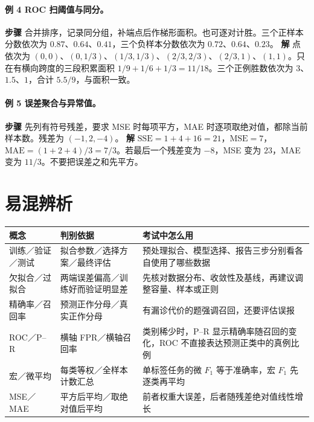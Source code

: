 \documentclass[UTF8,a4paper,zihao=-4,fontset=fandol]{ctexrep}
\begin{document}
\paragraph{例 4 ROC 扫阈值与同分。}
\textbf{步骤} 合并排序，记录同分组，补端点后作梯形面积。也可逐对计胜。三个正样本分数依次为 \(0.87\)、\(0.64\)、\(0.41\)，三个负样本分数依次为 \(0.72\)、\(0.64\)、\(0.23\)。
\textbf{解} 点依次为 \((0,0)\)、\((0,1/3)\)、\((1/3,1/3)\)、\((2/3,2/3)\)、\((2/3,1)\)、\((1,1)\)。只在有横向跨度的三段积累面积 \(1/9+1/6+1/3=11/18\)。三个正例胜数依次为 \(3\)、\(1.5\)、\(1\)，合计 \(5.5/9\)，与面积一致。

\paragraph{例 5 误差聚合与异常值。}
\textbf{步骤} 先列有符号残差，要求 MSE 时每项平方，MAE 时逐项取绝对值，都除当前样本数。残差为 \((-1,2,-4)\)。
\textbf{解} \(\mathrm{SSE}=1+4+16=21\)，\(\mathrm{MSE}=7\)，\(\mathrm{MAE}=(1+2+4)/3=7/3\)。若最后一个残差变为 \(-8\)，MSE 变为 \(23\)，MAE 变为 \(11/3\)。不要把误差之和先平方。

\section{易混辨析}
\noindent\begin{tabularx}{\linewidth}{@{}p{.22\linewidth}XX@{}}
\toprule
概念 & 判别依据 & 考试中怎么用\\
\midrule
训练／验证／测试 & 拟合参数／选择方案／最终评估 & 预处理拟合、模型选择、报告三步分别看各自使用了哪些数据\\
欠拟合／过拟合 & 两端误差偏高／训练好而验证明显差 & 先核对数据分布、收敛性及基线，再建议调整容量、样本或正则\\
精确率／召回率 & 预测正作分母／真实正作分母 & 有漏诊代价的题强调召回，还要评估误报\\
ROC／P--R & 横轴 FPR／横轴召回率 & 类别稀少时，P--R 显示精确率随召回的变化，ROC 不直接表达预测正类中的真例比例\\
宏／微平均 & 每类等权／全样本计数汇总 & 单标签任务的微 \(F_1\) 等于准确率，宏 \(F_1\) 先逐类再平均\\
MSE／MAE & 平方后平均／取绝对值后平均 & 前者权重大误差，后者随残差绝对值线性增长\\
\bottomrule
\end{tabularx}
\end{document}
